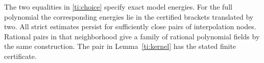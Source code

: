 The two equalities in \eqref{ti:choice} specify exact model energies. For
the full polynomial the corresponding energies lie in the certified
brackets translated by two. All strict estimates persist for sufficiently
close pairs of interpolation nodes. Rational pairs in that neighborhood
give a family of rational polynomial fields by the same construction.
The pair in Lemma~\ref{ti:kernel} has the stated finite certificate.
